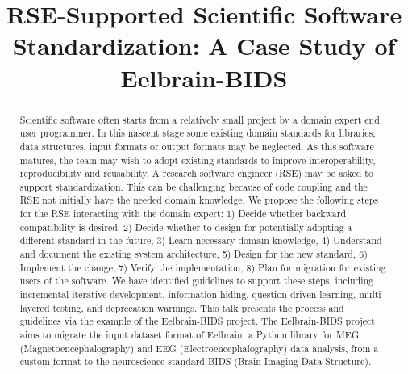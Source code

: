 \documentclass[conference]{IEEEtran}
\begin{document}
\title{RSE-Supported Scientific Software Standardization: A Case Study of Eelbrain-BIDS}

\author{
\and
{}
\and
{}
}

\maketitle

\begin{abstract}
    Scientific software often starts from a relatively small project by a domain expert end user programmer.  In this nascent stage some existing domain standards for libraries, data structures, input formats or output formats may be neglected. As this software matures, the team may wish to adopt existing standards to improve interoperability, reproducibility and reusability. A research software engineer (RSE) may be asked to support standardization.  This can be challenging because of code coupling and the RSE not initially have the needed domain knowledge.  We propose the following steps for the RSE interacting with the domain expert: 1) Decide whether backward compatibility is desired, 2) Decide whether to design for potentially adopting a different standard in the future, 3) Learn necessary domain knowledge, 4) Understand and document the existing system architecture, 5) Design for the new standard, 6) Implement the change, 7) Verify the implementation, 8) Plan for migration for existing users of the software.  We have identified guidelines to support these steps, including incremental iterative development, information hiding, question-driven learning, multi-layered testing, and deprecation warnings.  This talk presents the process and guidelines via the example of the Eelbrain-BIDS project.  The Eelbrain-BIDS project aims to migrate the input dataset format of Eelbrain, a Python library for MEG (Magnetoencephalography) and EEG (Electroencephalography) data analysis, from a custom format to the neuroscience standard BIDS (Brain Imaging Data Structure).
\end{abstract}
\end{document}
